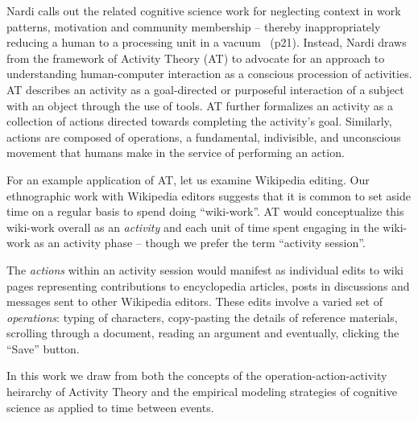 Nardi calls out the related cognitive science work for neglecting context in work patterns, motivation and community membership -- thereby inappropriately reducing a human to a processing unit in a vacuum~\cite{nardi1996context} (p21).  Instead, Nardi draws from the framework of Activity Theory (AT) to advocate for an approach to understanding human-computer interaction as a conscious procession of activities.  AT describes an activity as a goal-directed or purposeful interaction of a subject with an object through the use of tools. AT further formalizes an activity as a collection of actions directed towards completing the activity's goal.  Similarly, actions are composed of operations, a fundamental, indivisible, and unconscious movement that humans make in the service of performing an action.

For an example application of AT, let us examine Wikipedia editing.  Our ethnographic work with Wikipedia editors suggests that it is common to set aside time on a regular basis to spend doing ``wiki-work''.  AT would conceptualize this wiki-work overall as an \emph{activity} and each unit of time spent engaging in the wiki-work as an activity phase -- though we prefer the term ``activity session''.

The \emph{actions} within an activity session would manifest as individual edits to wiki pages representing contributions to encyclopedia articles, posts in discussions and messages sent to other Wikipedia editors.  These edits involve a varied set of \emph{operations}: typing of characters, copy-pasting the details of reference materials, scrolling through a document, reading an argument and eventually, clicking the ``Save'' button.

In this work we draw from both the concepts of the operation-action-activity heirarchy of Activity Theory and the empirical modeling strategies of cognitive science as applied to time between events.
